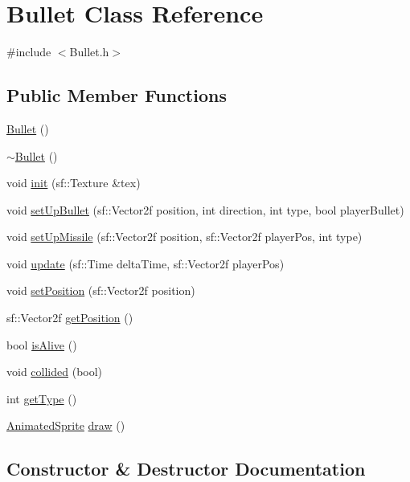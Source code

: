 \hypertarget{class_bullet}{}\section{Bullet Class Reference}
\label{class_bullet}


{\ttfamily \#include $<$Bullet.\+h$>$}

\subsection*{Public Member Functions}
\begin{DoxyCompactItemize}
\item 
\hyperlink{class_bullet_acd7befc0bc18907cc1d871d37bbdddeb}{Bullet} ()
\item 
\hyperlink{class_bullet_aaeb5cb41d7db89f49007b08b41f1bfcf}{$\sim$\+Bullet} ()
\item 
void \hyperlink{class_bullet_a0a0740a3138524771a496847f7198cf4}{init} (sf\+::\+Texture \&tex)
\item 
void \hyperlink{class_bullet_a94a279bd2d28fa50c0c639915300b52f}{set\+Up\+Bullet} (sf\+::\+Vector2f position, int direction, int type, bool player\+Bullet)
\item 
void \hyperlink{class_bullet_a5ee57e44e79f829920f4c117937d5f97}{set\+Up\+Missile} (sf\+::\+Vector2f position, sf\+::\+Vector2f player\+Pos, int type)
\item 
void \hyperlink{class_bullet_a9da6e150f1e7586f0f934b1ee029bc1a}{update} (sf\+::\+Time delta\+Time, sf\+::\+Vector2f player\+Pos)
\item 
void \hyperlink{class_bullet_a143a06245534960d6af5ffb10b101750}{set\+Position} (sf\+::\+Vector2f position)
\item 
sf\+::\+Vector2f \hyperlink{class_bullet_a64e4ce634f62ab31d338bd142c1987c9}{get\+Position} ()
\item 
bool \hyperlink{class_bullet_ae23f1f04ccd644d823184feb0da3c6b2}{is\+Alive} ()
\item 
void \hyperlink{class_bullet_a49da1f5862bcb89f36588ead6e620c06}{collided} (bool)
\item 
int \hyperlink{class_bullet_a73634149134359bca3f2201fb6284707}{get\+Type} ()
\item 
\hyperlink{class_animated_sprite}{Animated\+Sprite} \hyperlink{class_bullet_abd80643d0485e32232ad46cc2087de40}{draw} ()
\end{DoxyCompactItemize}


\subsection{Constructor \& Destructor Documentation}
\hypertarget{class_bullet_acd7befc0bc18907cc1d871d37bbdddeb}{}\label{class_bullet_acd7befc0bc18907cc1d871d37bbdddeb} 
